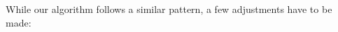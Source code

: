 \documentclass{article}
\newcommand{\kevin}[1]{\textcolor{violet}{\textbf{Kevin}: #1}}
\newcommand{\juli}[1]{\textcolor{orange}{\textbf{Juli}: #1}}
\theoremstyle{definition}
\begin{document}
%
While our algorithm follows a similar pattern, a few adjustments have to be made:
\end{document}
